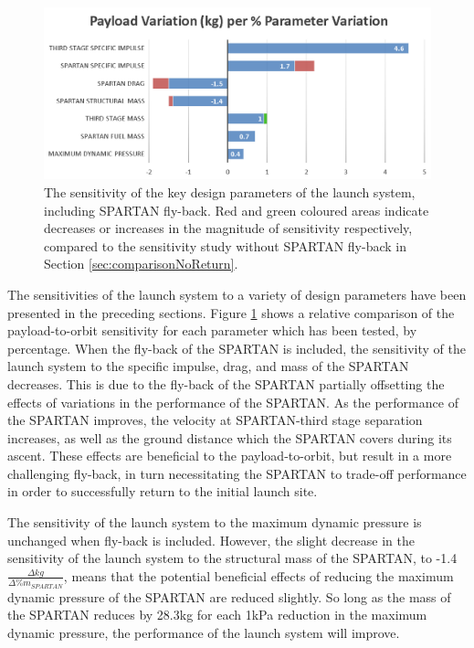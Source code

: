 \begin{figure}[th]
	\centering
	\includegraphics[width=0.99\linewidth]{figures/6_FlyBack/BarChart}
	\caption{The sensitivity of the key design parameters of the launch system, including SPARTAN fly-back. Red and green coloured areas indicate decreases or increases in the magnitude of sensitivity respectively, compared to the sensitivity study without SPARTAN fly-back in Section \ref{sec:comparisonNoReturn}.}
	\label{fig:BarChartreturn}
\end{figure}

The sensitivities of the launch system to a variety of design parameters have been presented in the preceding sections. Figure \ref{fig:BarChartreturn} shows a relative comparison of the payload-to-orbit sensitivity for each parameter which has been tested, by percentage. 
When the fly-back of the SPARTAN is included, the sensitivity of the launch system to the specific impulse, drag, and mass of the SPARTAN decreases.  
This is due to the fly-back of the SPARTAN partially offsetting the effects of variations in the performance of the SPARTAN. As the performance of the SPARTAN improves, the velocity at SPARTAN-third stage separation increases, as well as the ground distance which the SPARTAN covers during its ascent. These effects are beneficial to the payload-to-orbit, but result in a more challenging fly-back, in turn necessitating the SPARTAN to trade-off performance in order to successfully return to the initial launch site.

The sensitivity of the launch system to the maximum dynamic pressure is unchanged when fly-back is included. However, the slight decrease in the sensitivity of the launch system to the structural mass of the SPARTAN, to -1.4$\frac{\Delta kg}{\Delta\%m_{SPARTAN}}$, means that the potential beneficial effects of reducing the maximum dynamic pressure of the SPARTAN are reduced slightly. So long as the mass of the SPARTAN reduces by 28.3kg for each 1kPa reduction in the maximum dynamic pressure, the performance of the launch system will improve.

